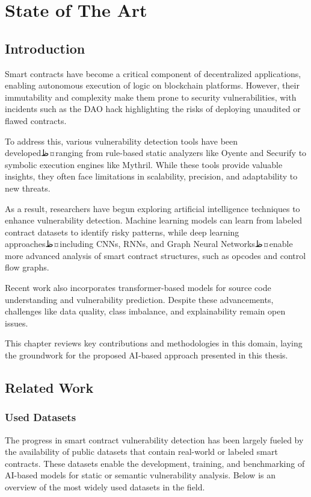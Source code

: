 \part{State of The Art}

\chapter{Introduction}
Smart contracts have become a critical component of decentralized applications, enabling autonomous execution of logic on blockchain platforms. However, their immutability and complexity make them prone to security vulnerabilities, with incidents such as the DAO hack highlighting the risks of deploying unaudited or flawed contracts.

To address this, various vulnerability detection tools have been developedظ¤ranging from rule-based static analyzers like Oyente and Securify to symbolic execution engines like Mythril. While these tools provide valuable insights, they often face limitations in scalability, precision, and adaptability to new threats.

As a result, researchers have begun exploring artificial intelligence techniques to enhance vulnerability detection. Machine learning models can learn from labeled contract datasets to identify risky patterns, while deep learning approachesظ¤including CNNs, RNNs, and Graph Neural Networksظ¤enable more advanced analysis of smart contract structures, such as opcodes and control flow graphs.

Recent work also incorporates transformer-based models for source code understanding and vulnerability prediction. Despite these advancements, challenges like data quality, class imbalance, and explainability remain open issues.

This chapter reviews key contributions and methodologies in this domain, laying the groundwork for the proposed AI-based approach presented in this thesis.

\chapter{Related Work}
\section{Used Datasets}
The progress in smart contract vulnerability detection has been largely fueled by the availability of public datasets that contain real-world or labeled smart contracts. These datasets enable the development, training, and benchmarking of AI-based models for static or semantic vulnerability analysis. Below is an overview of the most widely used datasets in the field.

